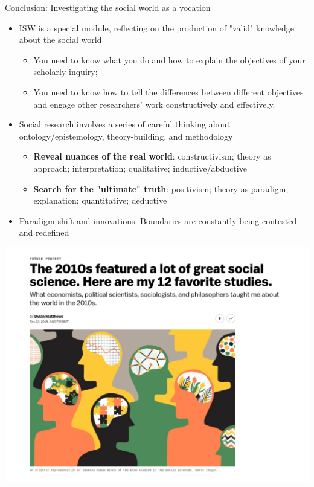 \documentclass[
  10pt,
  ignorenonframetext,
]{beamer}
\begin{document}
\begin{frame}{Conclusion: Investigating the social world as a vocation}
\protect\hypertarget{conclusion-investigating-the-social-world-as-a-vocation}{}
\begin{itemize}
  \item ISW is a special module, reflecting on the production of "valid" knowledge about the social world
  \begin{itemize}
    \item You need to know what you do and how to explain the objectives of your scholarly inquiry;
    \item You need to know how to tell the differences between different objectives and engage other researchers' work constructively and effectively.
  \end{itemize}
  \item Social research involves a series of careful thinking about ontology/epistemology, theory-building, and methodology
  \begin{itemize}
    \item \textbf{Reveal nuances of the real world}: constructivism; theory as approach; interpretation; qualitative; inductive/abductive
    \item \textbf{Search for the "ultimate" truth}: positivism; theory as paradigm; explanation; quantitative; deductive
  \end{itemize}
  \item Paradigm shift and innovations: Boundaries are constantly being contested and redefined
\end{itemize}
\end{frame}

\begin{frame}
\begin{center}\includegraphics[width=0.95\linewidth]{Figs/vox} \end{center}
\end{frame}
\end{document}
